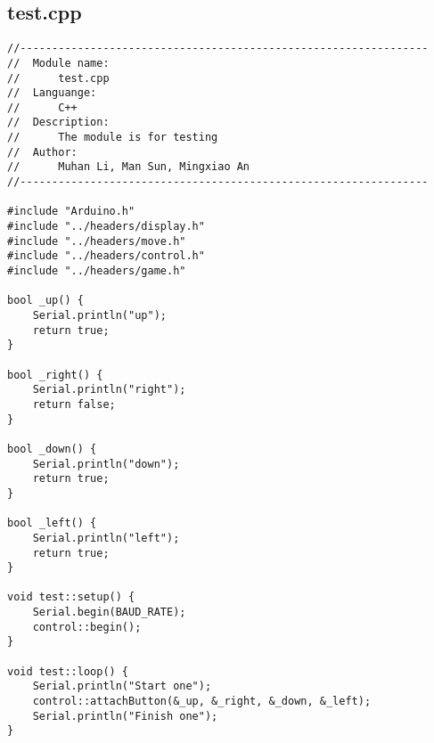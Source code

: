 \subsection{test.cpp}
\begin{verbatim}
//----------------------------------------------------------------
//  Module name:
//      test.cpp
//  Languange:
//      C++
//  Description:
//      The module is for testing
//  Author:
//      Muhan Li, Man Sun, Mingxiao An
//----------------------------------------------------------------

#include "Arduino.h"
#include "../headers/display.h"
#include "../headers/move.h"
#include "../headers/control.h"
#include "../headers/game.h"

bool _up() {
    Serial.println("up");
    return true;
}

bool _right() {
    Serial.println("right");
    return false;
}

bool _down() {
    Serial.println("down");
    return true;
}

bool _left() {
    Serial.println("left");
    return true;
}

void test::setup() {
    Serial.begin(BAUD_RATE);
    control::begin();
}

void test::loop() {
    Serial.println("Start one");
    control::attachButton(&_up, &_right, &_down, &_left);
    Serial.println("Finish one");
}
\end{verbatim}

